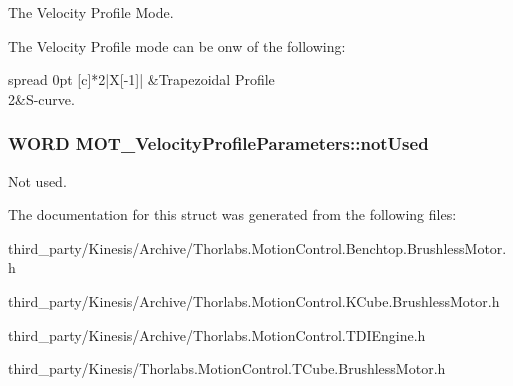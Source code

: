 The Velocity Profile Mode. 

The Velocity Profile mode can be onw of the following\+: \tabulinesep=1mm
\begin{longtabu} spread 0pt [c]{*2{|X[-1]}|}
&Trapezoidal Profile \\
2&S-\/curve. \\
\end{longtabu}
\subsubsection[{\texorpdfstring{not\+Used}{notUsed}}]{\setlength{\rightskip}{0pt plus 5cm}W\+O\+RD M\+O\+T\+\_\+\+Velocity\+Profile\+Parameters\+::not\+Used}\hypertarget{struct_m_o_t___velocity_profile_parameters_af186bfbfc25f5554b4c20a2fd8a0667c}{}\label{struct_m_o_t___velocity_profile_parameters_af186bfbfc25f5554b4c20a2fd8a0667c}


Not used. 



The documentation for this struct was generated from the following files\+:\begin{DoxyCompactItemize}
\item 
third\+\_\+party/\+Kinesis/\+Archive/Thorlabs.\+Motion\+Control.\+Benchtop.\+Brushless\+Motor.\+h\item 
third\+\_\+party/\+Kinesis/\+Archive/Thorlabs.\+Motion\+Control.\+K\+Cube.\+Brushless\+Motor.\+h\item 
third\+\_\+party/\+Kinesis/\+Archive/Thorlabs.\+Motion\+Control.\+T\+D\+I\+Engine.\+h\item 
third\+\_\+party/\+Kinesis/Thorlabs.\+Motion\+Control.\+T\+Cube.\+Brushless\+Motor.\+h\end{DoxyCompactItemize}

